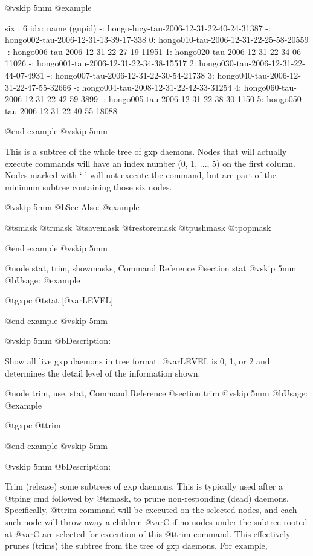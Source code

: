 @vskip 5mm
@example

  six : 6
   idx: name (gupid)
     -: hongo-lucy-tau-2006-12-31-22-40-24-31387
     -:  hongo002-tau-2006-12-31-13-39-17-338
     0:   hongo010-tau-2006-12-31-22-25-58-20559
     -:  hongo006-tau-2006-12-31-22-27-19-11951
     1:   hongo020-tau-2006-12-31-22-34-06-11026
     -:  hongo001-tau-2006-12-31-22-34-38-15517
     2:   hongo030-tau-2006-12-31-22-44-07-4931
     -:  hongo007-tau-2006-12-31-22-30-54-21738
     3:   hongo040-tau-2006-12-31-22-47-55-32666
     -:  hongo004-tau-2008-12-31-22-42-33-31254
     4:   hongo060-tau-2006-12-31-22-42-59-3899
     -:  hongo005-tau-2006-12-31-22-38-30-1150
     5:   hongo050-tau-2006-12-31-22-40-55-18088

@end example
@vskip 5mm

This is a subtree of the whole tree of gxp daemons.  Nodes that will
actually execute commands will have an index number (0, 1, ..., 5) on
the first column. Nodes marked with `-' will not execute the
command, but are part of the minimum subtree containing those six
nodes.

@vskip 5mm
@b{See Also:}
@example

  @t{smask} @t{rmask} @t{savemask} @t{restoremask} @t{pushmask} @t{popmask}

@end example
@vskip 5mm

@node stat, trim, showmasks, Command Reference
@section stat
@vskip 5mm
@b{Usage:}
@example

  @t{gxpc} @t{stat} [@var{LEVEL}]

@end example
@vskip 5mm

@vskip 5mm
@b{Description:}


  Show all live gxp daemons in tree format. @var{LEVEL} is 0, 1, or 2 and
determines the detail level of the information shown.

@node trim, use, stat, Command Reference
@section trim
@vskip 5mm
@b{Usage:}
@example

  @t{gxpc} @t{trim}

@end example
@vskip 5mm

@vskip 5mm
@b{Description:}


  Trim (release) some subtrees of gxp daemons. This is typically
used after a @t{ping} cmd followed by @t{smask}, to prune non-responding
(dead) daemons.  Specifically, @t{trim} command will be executed on
the selected nodes, and each such node will throw away a children
@var{C} if no nodes under the subtree rooted at @var{C} are selected for
execution of this @t{trim} command. This effectively prunes (trims)
the subtree from the tree of gxp daemons. For example,


